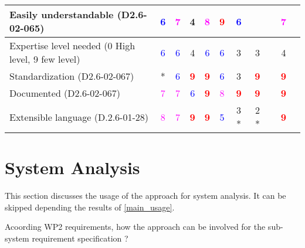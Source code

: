 \begin{tabular}{|l | c | c | c | c | c | c | c | c | c | c |}
\hline
Easily understandable (D2.6-02-065)  & \textcolor{blue}{6} & \textcolor{magenta}{7} & 4    & \textcolor{magenta}{8} & \textcolor{red}{\textbf{9}} & \textcolor{blue}{6} & & & \textcolor{magenta}{7} & \\
\hline
Expertise level needed (0 High level, 9 few level)  & \textcolor{blue}{6} & \textcolor{blue}{6} & 4    & \textcolor{blue}{6} & \textcolor{blue}{6} & 3    & 3    & & 4    & \\
\hline
Standardization (D2.6-02-067)  & * & \textcolor{blue}{6} & \textcolor{red}{\textbf{9}} & \textcolor{red}{\textbf{9}} & \textcolor{blue}{6} & 3    & \textcolor{red}{\textbf{9}} & & \textcolor{red}{\textbf{9}} & \\
\hline
Documented (D2.6-02-067)  & \textcolor{magenta}{7} & \textcolor{magenta}{7} & \textcolor{blue}{6} & \textcolor{red}{\textbf{9}} & \textcolor{magenta}{8} & \textcolor{red}{\textbf{9}} & \textcolor{red}{\textbf{9}} & & \textcolor{red}{\textbf{9}} & \\
\hline
Extensible language (D.2.6-01-28)  & \textcolor{magenta}{8} & \textcolor{magenta}{7} & \textcolor{red}{\textbf{9}} & \textcolor{red}{\textbf{9}} & \textcolor{blue}{5} & 3   * & 2   * & & \textcolor{red}{\textbf{9}} & \\
\hline
\end{tabular}


\section{System Analysis}
This section discusses the usage of the approach for system analysis.
It can be skipped depending the results of \ref{main_usage}.

Acoording WP2 requirements, how the approach can be involved for the sub-system requirement specification ?

